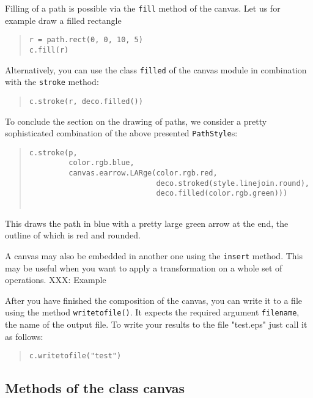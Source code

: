 Filling of a path is possible via the \verb|fill| method of the canvas.
Let us for example draw a filled rectangle 
\begin{quote}
\begin{verbatim}
r = path.rect(0, 0, 10, 5)
c.fill(r)
\end{verbatim}
\end{quote}
Alternatively, you can use the class \verb|filled| of the canvas module
in combination with the \verb|stroke| method:
\begin{quote}
\begin{verbatim}
c.stroke(r, deco.filled())
\end{verbatim}
\end{quote}

To conclude the section on the drawing of paths, we consider a pretty
sophisticated combination of the above presented \verb|PathStyle|s:
\begin{quote}
\begin{verbatim}
c.stroke(p, 
         color.rgb.blue, 
         canvas.earrow.LARge(color.rgb.red,
                             deco.stroked(style.linejoin.round),
                             deco.filled(color.rgb.green)))
                                                              
\end{verbatim}
\end{quote}
This draws the path in blue with a pretty large green arrow at the
end, the outline of which is red and rounded.

A canvas may also be embedded in another one using the \texttt{insert}
method. This may be useful when you want to apply a transformation on
a whole set of operations. XXX: Example

After you have finished the composition of the canvas, you can
write it to a file using the method \verb|writetofile()|. It expects the
required argument \verb|filename|, the name of the output
file. To write your results to the file "test.eps" just call it as follows:
\begin{quote}
\begin{verbatim}
c.writetofile("test")
\end{verbatim}
\end{quote}


\subsection{Methods of the class canvas}

